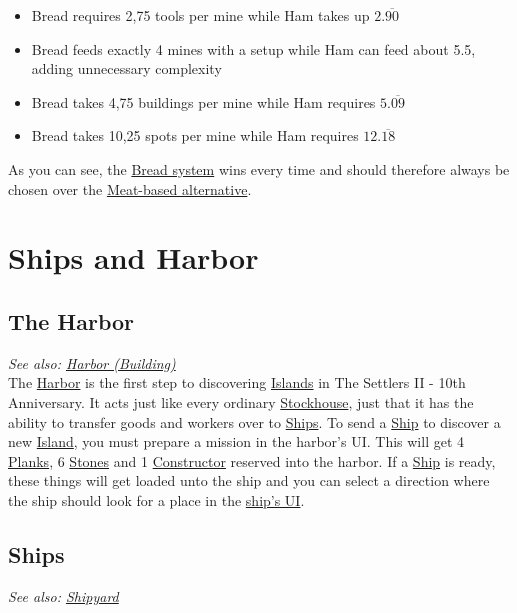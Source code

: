 \documentclass[12pt]{article}
\begin{document}
\begin{itemize}
  \item Bread requires 2,75 tools per mine while Ham takes up $2.\overline{90}$
  \item Bread feeds exactly 4 mines with a setup while Ham can feed about 5.5, adding unnecessary complexity
  \item Bread takes 4,75 buildings per mine while Ham requires $5.\overline{09}$
  \item Bread takes 10,25 spots per mine while Ham requires $12.\overline{18}$
\end{itemize}

As you can see, the \hyperref[sec:bread]{Bread system} wins every time and should therefore always be chosen over the \hyperref[sec:hamslaughter]{Meat-based alternative}.

\section{Ships and Harbor}
\label{sec:shipsandharbor}

\subsection{The Harbor}
\label{sec:harbor}

\textit{See also: \hyperref[sec:harbor_building]{Harbor (Building)}}\\

The \hyperref[sec:building_harbor]{Harbor} is the first step to discovering \hyperref[sec:islands]{Islands} in The Settlers II - 10th Anniversary. It acts just like every ordinary \hyperref[sec:stockhouse]{Stockhouse}, just that it has the ability to transfer goods and workers over to \hyperref[sec:ships]{Ships}. To send a \hyperref[sec:ships]{Ship} to discover a new \hyperref[sec:islands]{Island}, you must prepare a mission in the harbor's UI. This will get 4 \hyperref[sec:plank]{Planks}, 6 \hyperref[sec:stone]{Stones} and 1 \hyperref[sec:constructor]{Constructor} reserved into the harbor. If a \hyperref[sec:ships]{Ship} is ready, these things will get loaded unto the ship and you can select a direction where the ship should look for a place in the \hyperref[sec:ships]{ship's UI}.

\subsection{Ships}
\label{sec:ships}

\textit{See also: \hyperref[sec:shipyard]{Shipyard}}\\
\end{document}
